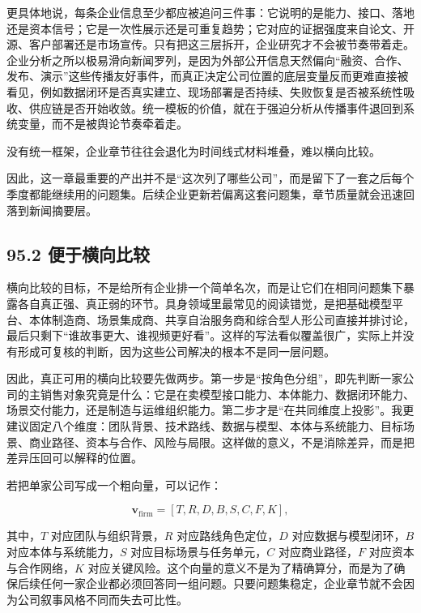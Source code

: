 更具体地说，每条企业信息至少都应被追问三件事：它说明的是能力、接口、落地还是资本信号；它是一次性展示还是可重复趋势；它对应的证据强度来自论文、开源、客户部署还是市场宣传。只有把这三层拆开，企业研究才不会被节奏带着走。 企业分析之所以极易滑向新闻罗列，是因为外部公开信息天然偏向“融资、合作、发布、演示”这些传播友好事件，而真正决定公司位置的底层变量反而更难直接被看见，例如数据闭环是否真实建立、现场部署是否持续、失败恢复是否被系统性吸收、供应链是否开始收敛。统一模板的价值，就在于强迫分析从传播事件退回到系统变量，而不是被舆论节奏牵着走。

没有统一框架，企业章节往往会退化为时间线式材料堆叠，难以横向比较。

因此，这一章最重要的产出并不是“这次列了哪些公司”，而是留下了一套之后每个季度都能继续用的问题集。后续企业更新若偏离这套问题集，章节质量就会迅速回落到新闻摘要层。

\subsection*{95.2 便于横向比较}


横向比较的目标，不是给所有企业排一个简单名次，而是让它们在相同问题集下暴露各自真正强、真正弱的环节。具身领域里最常见的阅读错觉，是把基础模型平台、本体制造商、场景集成商、共享自治服务商和综合型人形公司直接并排讨论，最后只剩下“谁故事更大、谁视频更好看”。这样的写法看似覆盖很广，实际上并没有形成可复核的判断，因为这些公司解决的根本不是同一层问题。

因此，真正可用的横向比较要先做两步。第一步是“按角色分组”，即先判断一家公司的主销售对象究竟是什么：它是在卖模型接口能力、本体能力、数据闭环能力、场景交付能力，还是制造与运维组织能力。第二步才是“在共同维度上投影”。我更建议固定八个维度：团队背景、技术路线、数据与模型、本体与系统能力、目标场景、商业路径、资本与合作、风险与局限。这样做的意义，不是消除差异，而是把差异压回可以解释的位置。

若把单家公司写成一个粗向量，可以记作：

\begin{equation*}
\mathbf{v}_{\text{firm}} = [T, R, D, B, S, C, F, K],
\end{equation*}

其中，\(T\) 对应团队与组织背景，\(R\) 对应路线角色定位，\(D\) 对应数据与模型闭环，\(B\) 对应本体与系统能力，\(S\) 对应目标场景与任务单元，\(C\) 对应商业路径，\(F\) 对应资本与合作网络，\(K\) 对应关键风险。这个向量的意义不是为了精确算分，而是为了确保后续任何一家企业都必须回答同一组问题。只要问题集稳定，企业章节就不会因为公司叙事风格不同而失去可比性。

